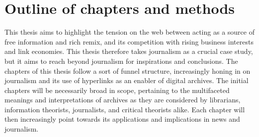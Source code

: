 




\section{Outline of chapters and methods}


This thesis aims to highlight the tension on the web between acting as a source of free information and rich remix, and its competition with rising business interests and link economies. This thesis therefore takes journalism as a crucial case study, but it aims to reach beyond journalism for inspirations and conclusions. The chapters of this thesis follow a sort of funnel structure, increasingly honing in on journalism and its use of hyperlinks as an enabler of digital archives. The initial chapters will be necessarily broad in scope, pertaining to the multifaceted meanings and interpretations of archives as they are considered by librarians, information theorists, journalists, and critical theorists alike. Each chapter will then increasingly point towards its applications and implications in news and journalism.

